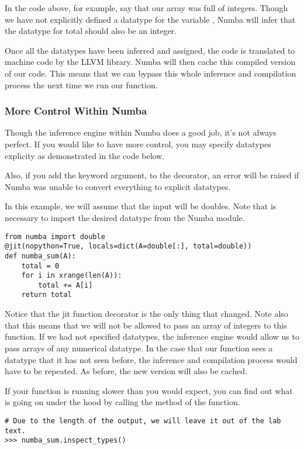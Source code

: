 In the code above, for example, say that our array  was full of integers. Though we have not explicitly defined a datatype for the variable , Numba will infer that the datatype for total should also be an integer.

Once all the datatypes have been inferred and assigned, the code is translated to machine code by the LLVM library. Numba will then cache this compiled version of our code. This means that we can bypass this whole inference and compilation process the next time we run our function.

\subsubsection*{More Control Within Numba}
Though the inference engine within Numba does a good job, it's not always perfect. If you would like to have more control, you may specify datatypes explicity as demonstrated in the code below.

Also, if you add the keyword argument,  to the  decorator, an error will be raised if Numba was unable to convert everything to explicit datatypes.

In this example, we will assume that the input will be doubles. Note that is necessary to import the desired datatype from the Numba module.

\begin{lstlisting}
from numba import double
@jit(nopython=True, locals=dict(A=double[:], total=double))
def numba_sum(A):
    total = 0
    for i in xrange(len(A)):
        total += A[i]
    return total
\end{lstlisting}
Notice that the jit function decorator is the only thing that changed. Note also that this means that we will not be allowed to pass an array of integers to this function. If we had not specified datatypes, the inference engine would allow us to pass arrays of any numerical datatype. In the case that our function sees a datatype that it has not seen before, the inference and compilation process would have to be repeated. As before, the new version will also be cached.

If your function is running slower than you would expect, you can find out what is going on under the hood by calling the  method of the function.

\begin{lstlisting}
# Due to the length of the output, we will leave it out of the lab text.
>>> numba_sum.inspect_types()
\end{lstlisting}


